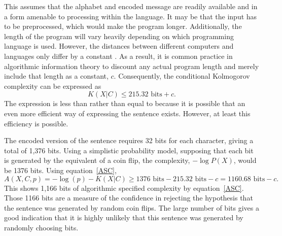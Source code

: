 This assumes that the alphabet and encoded message are readily available and in a form amenable to processing within the language.
It may be that the input has to be preprocessed, which would make the program longer.
Additionally, the length of the program will vary heavily depending on which programming language is used.
However, the distances between different computers and languages only differ by a constant \citep{Cover2006}.
As a result, it is common practice in algorithmic information theory to discount any actual program length and merely include that length 
as a constant, $c$. 
Consequently, the conditional Kolmogorov complexity can be expressed as 
\begin{equation}
    \label{kc.alpha}
    K(X|C) \leq 215.32 \mbox{ bits} + c \mbox{.}
\end{equation}
The expression is less than rather than equal to because it is possible that an even more efficient way of expressing the sentence exists.
However, at least this efficiency is possible.

The encoded version of the sentence requires 32 bits for each character, giving a total of 1,376 bits.
Using a simplistic probability model, supposing that each bit is generated by the equivalent of a coin flip,
the complexity, $-\log P(X)$, would be 1376 bits.
Using equation~\ref{ASC},
\begin{equation}
    A(X,C,p) = -\log(p) - K(X|C) \geq 1376 \mbox{ bits} - 215.32 \mbox{ bits} - c  = 1160.68 \mbox{ bits} - c \mbox{.}
\end{equation}
This shows 1,166 bits of algorithmic specified complexity by equation~\ref{ASC}.
Those 1166 bits are a measure of the confidence in rejecting the hypothesis that the sentence was generated by random coin flips.
The large number of bits gives a good indication that it is highly unlikely that this sentence was generated by randomly choosing bits.

